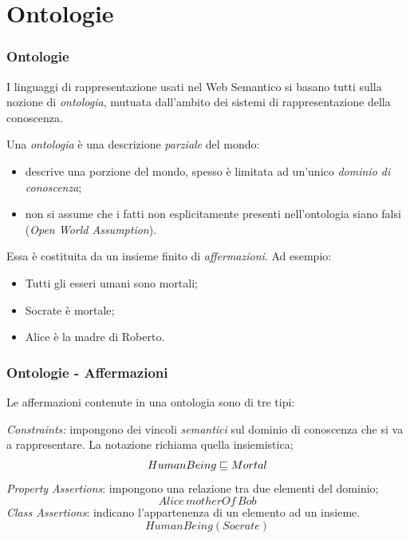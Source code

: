 \documentclass[8pt]{beamer}
\begin{document}
\section{Ontologie}
\begin{frame}
\frametitle{Ontologie}
 I linguaggi di rappresentazione usati nel Web Semantico
 si basano tutti sulla nozione di \emph{ontologia}, mutuata
 dall'ambito dei sistemi di rappresentazione della conoscenza.
 \vspace{\baselineskip}
\vspace{\baselineskip}

Una \emph{ontologia} \`e una descrizione \emph{parziale} del mondo:
\begin{itemize}
 \item descrive una porzione del mondo, spesso \`e limitata ad un'unico \emph{dominio di conoscenza};
 \item non si assume che i fatti non esplicitamente presenti nell'ontologia siano falsi (\emph{Open World Assumption}).
\end{itemize}
\vspace{\baselineskip}

Essa \`e costituita da un insieme finito di \emph{affermazioni}. Ad esempio:
\begin{itemize}
 \item Tutti gli esseri umani sono mortali;
 \item Socrate \`e mortale;
 \item Alice \`e la madre di Roberto.
\end{itemize}
\end{frame}

\begin{frame}
\frametitle{Ontologie - Affermazioni}
Le affermazioni contenute in una ontologia sono di tre tipi:
\vspace{\baselineskip}

\emph{Constraints:} impongono dei vincoli \emph{semantici} sul dominio di conoscenza 
che si va a rappresentare. La notazione richiama quella insiemistica;
\vspace{\baselineskip}
\[
 HumanBeing \sqsubseteq Mortal 
\]
\emph{Property Assertions}: impongono una relazione tra due elementi del dominio;
\[
 Alice\,motherOf\,Bob 
\]
\emph{Class Assertions}: indicano l'appartenenza di un elemento ad un insieme.
\[
 HumanBeing(Socrate) 
\]
\end{frame}


\newcommand{\CNames}{N_C}
\newcommand{\PNames}{N_P}
\newcommand{\INames}{N_I}
\newcommand{\VNames}{V}
\end{document}
